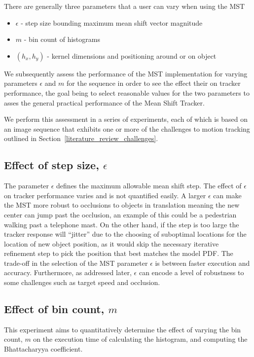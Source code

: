 There are generally three parameters that a user can vary when using the MST
\begin{itemize}
    \item $\epsilon$ - step size bounding maximum mean shift vector magnitude
    \item $m$ - bin count of histograms
    \item $(h_x,h_y)$ - kernel dimensions and positioning around or on object
\end{itemize}
We subsequently assess the performance of the MST implementation
for varying parameters $\epsilon$ and $m$ for the sequence in order to see the
effect their on tracker performance, the goal being to select reasonable values
for the two parameters to asses the general practical performance of the Mean
Shift Tracker. 

We perform this assessment in a series of experiments, each of which is based on an image
sequence that exhibits one or more of the challenges to motion tracking outlined
in Section~\ref{literature_review_challenges}. 
 
\subsection{Effect of step size, $\epsilon$}\label{results_eps}
The parameter $\epsilon$ defines the maximum allowable mean shift step. The
effect of $\epsilon$ on tracker performance varies and is not quantified easily.
A larger $\epsilon$ can make the MST more robust to occlusions to objects in
translation meaning the new center can jump past the occlusion, an example of
this could be a pedestrian walking past a telephone mast. On the other hand,
if the step is too large the tracker response will ``jitter'' due to the
choosing of suboptimal locations for the location of new object position, as it
would skip the necessary iterative refinement step to pick the position that best
matches the model PDF. 
The trade-off in the selection of the MST parameter $\epsilon$ is between faster
execution and accuracy.
Furthermore, as addressed later, $\epsilon$ can encode a level of robustness to some challenges such
as target speed and occlusion. 

\subsection{Effect of bin count, $m$}\label{results_m}
This experiment aims to quantitatively determine the effect of varying the
bin count, $m$ on the execution time of calculating the histogram, and computing
the Bhattacharyya coefficient.

